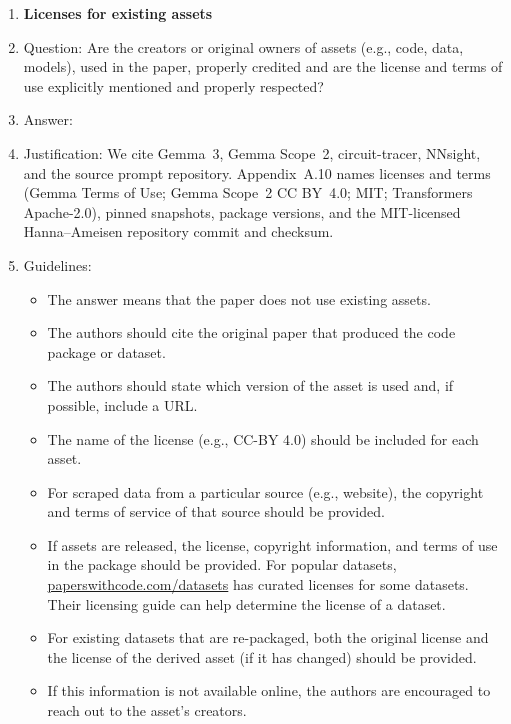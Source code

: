 \documentclass[
]{article}
\begin{document}
\begin{enumerate}
\item {\bf Licenses for existing assets}
    \item[] Question: Are the creators or original owners of assets (e.g., code, data, models), used in the paper, properly credited and are the license and terms of use explicitly mentioned and properly respected?
    \item[] Answer: \answerYes{} %
    \item[] Justification: We cite Gemma~3, Gemma Scope~2, circuit-tracer, NNsight, and the source prompt repository. Appendix~A.10 names licenses and terms (Gemma Terms of Use; Gemma Scope~2 CC BY~4.0; MIT; Transformers Apache-2.0), pinned snapshots, package versions, and the MIT-licensed Hanna--Ameisen repository commit and checksum.
    \item[] Guidelines:
    \begin{itemize}
        \item The answer \answerNA{} means that the paper does not use existing assets.
        \item The authors should cite the original paper that produced the code package or dataset.
        \item The authors should state which version of the asset is used and, if possible, include a URL.
        \item The name of the license (e.g., CC-BY 4.0) should be included for each asset.
        \item For scraped data from a particular source (e.g., website), the copyright and terms of service of that source should be provided.
        \item If assets are released, the license, copyright information, and terms of use in the package should be provided. For popular datasets, \url{paperswithcode.com/datasets} has curated licenses for some datasets. Their licensing guide can help determine the license of a dataset.
        \item For existing datasets that are re-packaged, both the original license and the license of the derived asset (if it has changed) should be provided.
        \item If this information is not available online, the authors are encouraged to reach out to the asset's creators.
    \end{itemize}


\end{enumerate}
\end{document}
